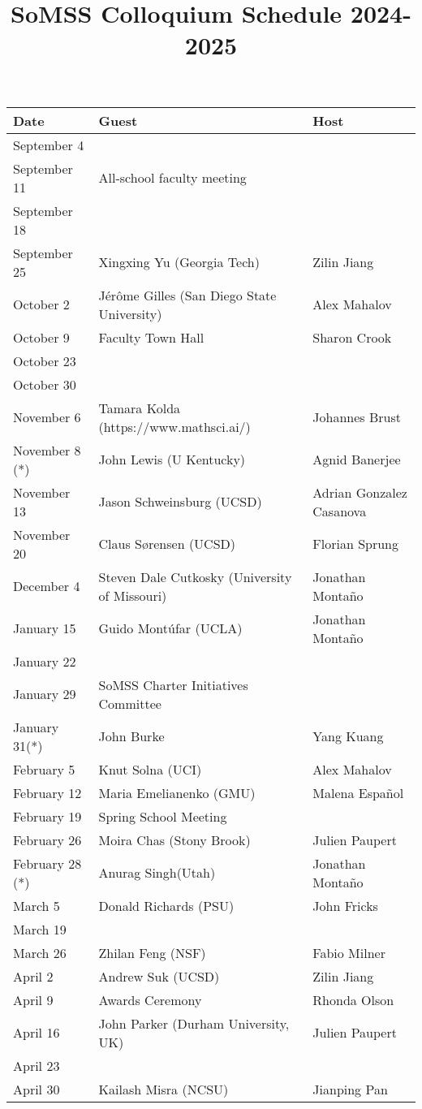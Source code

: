 \documentclass[11pt]{article}
\begin{document}
\title{SoMSS Colloquium Schedule 2024-2025}
\author{}
\date{}
\maketitle
\begin{center}
\begin{tabular}{|l|l|l|}
\hline
Date & Guest & Host\\
\hline
September 4 & & \\
September 11 & All-school faculty meeting & \\
September 18 & & \\
September 25 & Xingxing Yu (Georgia Tech) & Zilin Jiang\\
October 2 &J\'er\^ome Gilles (San Diego State University)& Alex Mahalov \\
October 9 & Faculty Town Hall & Sharon Crook\\
October 23 & & \\
October 30 & & \\
November 6 & Tamara Kolda (https://www.mathsci.ai/) & Johannes Brust\\
November 8 (*) & John Lewis (U Kentucky) & Agnid Banerjee\\
November 13 & Jason Schweinsburg (UCSD) & Adrian Gonzalez Casanova\\
November 20 &Claus S\o rensen (UCSD) & Florian Sprung \\
December 4 & Steven Dale Cutkosky (University of Missouri) & Jonathan Monta\~no \\
January 15 & Guido Mont\'ufar (UCLA) & Jonathan Monta\~no \\
January 22 & &\\
January 29 & SoMSS Charter Initiatives Committee &\\
January 31(*) & John Burke& Yang Kuang \\
February 5 & Knut Solna (UCI) & Alex Mahalov\\
February 12 & Maria Emelianenko (GMU) & Malena Espa\~nol\\
February 19 & Spring School Meeting & \\
February 26  & Moira Chas (Stony Brook) & Julien Paupert \\
February 28 (*) & Anurag Singh(Utah) & Jonathan Monta\~no\\
March 5 & Donald Richards (PSU) & John Fricks \\
March 19 & & \\
March 26 &Zhilan Feng (NSF) & Fabio Milner\\
April 2 & Andrew Suk (UCSD) & Zilin Jiang\\
April 9 & Awards Ceremony & Rhonda Olson\\
April 16 & John Parker (Durham University, UK)& Julien Paupert \\
April 23 & & \\
April 30 & Kailash Misra  (NCSU) & Jianping Pan\\
\hline
\end{tabular}
\end{center}
\end{document}

